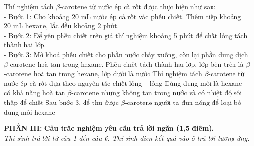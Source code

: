 \documentclass[11pt,a4paper]{article}
\begin{document}
\begin{ex}
Thí nghiệm tách $\beta$-carotene từ nước ép cà rốt được thực hiện như sau:\\
- Bước 1: Cho khoảng $20\text{ mL}$ nước ép cà rốt vào phễu chiết. Thêm tiếp khoảng $20\text{ mL}$ hexane, lắc đều khoảng 2 phút.\\
- Bước 2: Để yên phễu chiết trên giá thí nghiệm khoảng 5 phút để chất lỏng tách thành hai lớp.\\
- Bước 3: Mở khoá phễu chiết cho phần nước chảy xuống, còn lại phần dung dịch $\beta$-carotene hoà tan trong hexane.
\choiceTF
{\True Phễu chiết tách thành hai lớp, lớp bên trên là $\beta$-carotene hoà tan trong hexane, lớp dưới là nước}
{\True Thí nghiệm tách $\beta$-carotene từ nước ép cà rốt dựa theo nguyên tắc chiết lỏng – lỏng}
{\True Dùng dung môi là hexane có khả năng hoà tan $\beta$-carotene nhưng không tan trong nước và có nhiệt độ sôi thấp để chiết}
{\True Sau bước 3, để thu được $\beta$-carotene người ta đun nóng để loại bỏ dung môi hexane}

\end{ex}
\vspace{4pt}
\noindent
{\color{mainGreen}\textbf{\large PHẦN III: Câu trắc nghiệm yêu cầu trả lời ngắn (1,5 điểm).}}\\
\textit{\small Thí sinh trả lời từ câu 1 đến câu 6. Thí sinh điền kết quả vào ô trả lời tương ứng.}
\vspace{2pt}
\end{document}
